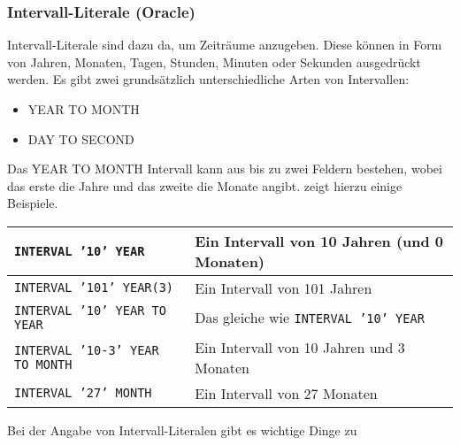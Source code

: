         \subsubsection{Intervall-Literale (Oracle)}
          Intervall-Literale sind dazu da, um Zeiträume anzugeben. Diese
          können in Form von Jahren, Monaten, Tagen, Stunden, Minuten oder
          Sekunden ausgedrückt werden. Es gibt zwei grundsätzlich 
          unterschiedliche Arten von Intervallen:
          \begin{itemize}
            \item YEAR TO MONTH
            \item DAY TO SECOND
          \end{itemize}
          Das YEAR TO MONTH Intervall kann aus bis zu zwei Feldern bestehen,
           wobei das erste die Jahre und das zweite die Monate angibt.
            zeigt hierzu einige Beispiele.
          \begin{center}
            \label{yeartomonth}
            \begin{small}
              \tabletail{
                \hline
              }
              \tablelasttail{
                \hline
              }
              \begin{supertabular}{|l|p{9cm}|}
                \texttt{INTERVAL '10' YEAR} & Ein Intervall von 10 Jahren (und 0 Monaten) \\
                \hline
                \texttt{INTERVAL '101' YEAR(3)} & Ein Intervall von 101 Jahren \\
                \hline
                \texttt{INTERVAL '10' YEAR TO YEAR} & Das gleiche wie \texttt{INTERVAL '10' YEAR} \\
                \hline
                \texttt{INTERVAL '10-3' YEAR TO MONTH} & Ein Intervall von 10 Jahren und 3 Monaten \\
                \hline
                \texttt{INTERVAL '27' MONTH} & Ein Intervall von 27 Monaten \\
              \end{supertabular}
            \end{small}
          \end{center}
           Bei der Angabe von Intervall-Literalen gibt es wichtige Dinge zu
